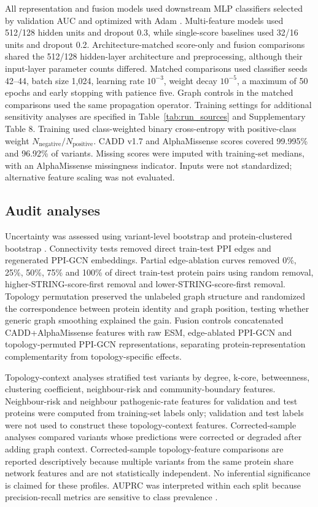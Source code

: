 \documentclass[conference]{IEEEtran}
\newcommand{\CADDAM}{CADD\allowbreak{}+\allowbreak{}AlphaMissense}
\begin{document}
All representation and fusion models used downstream MLP classifiers selected by validation AUC and optimized with Adam \cite{Kingma2015Adam}. Multi-feature models used 512/128 hidden units and dropout 0.3, while single-score baselines used 32/16 units and dropout 0.2. Architecture-matched score-only and fusion comparisons shared the 512/128 hidden-layer architecture and preprocessing, although their input-layer parameter counts differed. Matched comparisons used classifier seeds 42--44, batch size 1,024, learning rate $10^{-3}$, weight decay $10^{-5}$, a maximum of 50 epochs and early stopping with patience five. Graph controls in the matched comparisons used the same propagation operator. Training settings for additional sensitivity analyses are specified in Table~\ref{tab:run_sources} and Supplementary Table 8. Training used class-weighted binary cross-entropy with positive-class weight $N_{\mathrm{negative}}/N_{\mathrm{positive}}$. CADD v1.7 and AlphaMissense scores \cite{Kircher2014CADD,Schubach2024CADDv17,Cheng2023AlphaMissense} covered 99.995\% and 96.92\% of variants. Missing scores were imputed with training-set medians, with an AlphaMissense missingness indicator. Inputs were not standardized; alternative feature scaling was not evaluated.

\subsection{Audit analyses}

Uncertainty was assessed using variant-level bootstrap and protein-clustered bootstrap \cite{Efron1993Bootstrap}. Connectivity tests removed direct train-test PPI edges and regenerated PPI-GCN embeddings. Partial edge-ablation curves removed 0\%, 25\%, 50\%, 75\% and 100\% of direct train-test protein pairs using random removal, higher-STRING-score-first removal and lower-STRING-score-first removal. Topology permutation preserved the unlabeled graph structure and randomized the correspondence between protein identity and graph position, testing whether generic graph smoothing explained the gain. Fusion controls concatenated \CADDAM{} features with raw ESM, edge-ablated PPI-GCN and topology-permuted PPI-GCN representations, separating protein-representation complementarity from topology-specific effects.

Topology-context analyses stratified test variants by degree, k-core, betweenness, clustering coefficient, neighbour-risk and community-boundary features. Neighbour-risk and neighbour pathogenic-rate features for validation and test proteins were computed from training-set labels only; validation and test labels were not used to construct these topology-context features. Corrected-sample analyses compared variants whose predictions were corrected or degraded after adding graph context. Corrected-sample topology-feature comparisons are reported descriptively because multiple variants from the same protein share network features and are not statistically independent. No inferential significance is claimed for these profiles. AUPRC was interpreted within each split because precision-recall metrics are sensitive to class prevalence \cite{Saito2015PrecisionRecall}.
\end{document}
